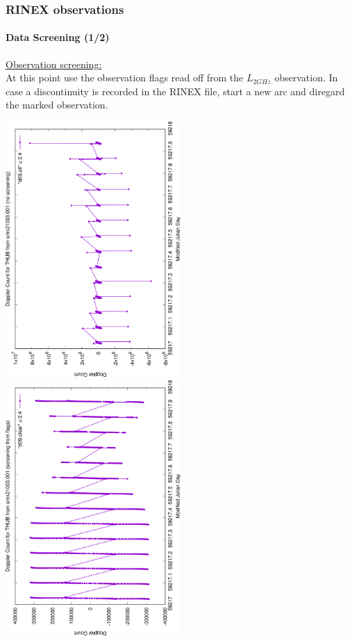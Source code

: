 \documentclass{beamer}
\begin{document}
\begin{frame}\frametitle{RINEX observations}\framesubtitle{Data Screening (1/2)}
  \underline{Observation screening:}\\
  At this point use the observation flags read off from the \(L_{2GHz}\) observation. 
  In case a discontinuity is recorded in the RINEX file, start a new arc and diregard 
  the marked observation.

  \includegraphics[angle=-90, width=0.50\textwidth]{THUB-srlrx21003.001-allobs}%
  \includegraphics[angle=-90, width=0.50\textwidth]{THUB-srlrx21003.001-screened}

\end{frame}
\end{document}
